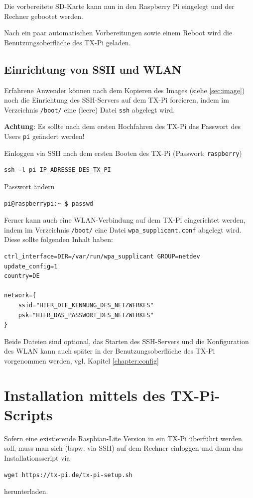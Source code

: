 \documentclass[
  paper=A4,
  ngerman,
  fontsize=12pt,
  parskip=half-,
]{scrbook}
\begin{document}
Die vorbereitete SD-Karte kann nun in den Raspberry Pi eingelegt
und der Rechner gebootet werden.

Nach ein paar automatischen Vorbereitungen sowie einem Reboot wird 
die Benutzungsoberfläche des TX-Pi geladen. 

\subsection{Einrichtung von SSH und WLAN}
Erfahrene Anwender können nach dem Kopieren des Images (siehe \ref{sec:image}) noch die Einrichtung
des SSH-Servers auf dem TX-Pi forcieren, indem im Verzeichnis \texttt{/boot/}
eine (leere) Datei \texttt{ssh} abgelegt wird. 

\textbf{Achtung}: Es sollte nach dem ersten Hochfahren des TX-Pi
das Passwort des Users \texttt{pi} geändert werden!

Einloggen via SSH nach dem ersten Booten des TX-Pi (Passwort: \texttt{raspberry})
\begin{lstlisting}
ssh -l pi IP_ADRESSE_DES_TX_PI
\end{lstlisting}

Passwort ändern
\begin{lstlisting}
pi@raspberrypi:~ $ passwd
\end{lstlisting}

Ferner kann auch eine WLAN-Verbindung auf dem TX-Pi eingerichtet 
werden, indem im Verzeichnis \texttt{/boot/} eine Datei 
\texttt{wpa\_supplicant.conf} abgelegt wird. 
Diese sollte folgenden Inhalt haben:
\begin{lstlisting}
ctrl_interface=DIR=/var/run/wpa_supplicant GROUP=netdev
update_config=1
country=DE

network={
    ssid="HIER_DIE_KENNUNG_DES_NETZWERKES"
    psk="HIER_DAS_PASSWORT_DES_NETZWERKES"
}
\end{lstlisting}

Beide Dateien sind optional, das Starten des SSH-Servers und
die Konfiguration des WLAN kann auch später in der Benutzungsoberfläche
des TX-Pi vorgenommen werden, vgl. Kapitel \ref{chapter:config}


\section{Installation mittels des TX-Pi-Scripts}

Sofern eine existierende Raspbian-Lite Version in ein TX-Pi
überführt werden soll, muss man sich (bspw. via SSH) auf dem 
Rechner einloggen und dann das Installationsscript via
\begin{lstlisting}
wget https://tx-pi.de/tx-pi-setup.sh
\end{lstlisting}
herunterladen.
\end{document}
